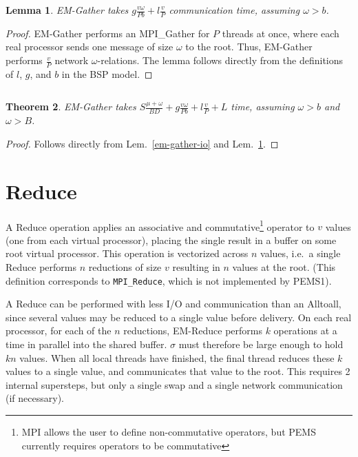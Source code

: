 \documentclass[12pt]{carletoncsthesis}
\newtheorem{thm}{Theorem}[section]
\newtheorem{lemma}[thm]{Lemma}
\begin{document}
$ $ \\

\begin{lemma}
\label{em-gather-comm}
{\sc EM-Gather} takes $g\frac{v\omega}{Pb} + l\frac{v}{P}$ communication
time, assuming $\omega > b$.
\end{lemma}
\begin{proof}
{\sc EM-Gather} performs an {\sc MPI\_Gather} for $P$ threads at once,
where each real processor sends one message of size $\omega$ to the root.
Thus, {\sc EM-Gather} performs $\frac{v}{P}$ network $\omega$-relations.
The lemma follows directly from the definitions of $l$, $g$, and $b$ in the
BSP model.
\end{proof}

$ $ \\

\begin{thm}
\label{em-gather-time}
{\sc EM-Gather} takes $S\frac{\mu + \omega}{BD} + g\frac{v\omega}{Pb} +
l\frac{v}{P} + L$ time, assuming $\omega > b$ and $\omega > B$.
\end{thm}
\begin{proof}
Follows directly from Lem.~\ref{em-gather-io} and Lem.~\ref{em-gather-comm}.
\end{proof}


\clearpage
\section{Reduce}


A Reduce operation applies an associative and commutative\footnote{MPI
allows the user to define non-commutative operators, but PEMS currently
requires operators to be commutative} operator to $v$ values (one from
each virtual processor), placing the single result in a buffer on some
root virtual processor.  This operation is vectorized across $n$ values,
i.e.\ a single Reduce performs $n$ reductions of size $v$ resulting in $n$
values at the root.  (This definition corresponds to {\tt MPI\_Reduce},
which is not implemented by PEMS1).

A Reduce can be performed with less I/O and communication than an Alltoall,
since several values may be reduced to a single value before delivery.
On each real processor, for each of the $n$ reductions, {\sc EM-Reduce}
performs $k$ operations at a time in parallel into the shared buffer.  $\sigma$
must therefore be large enough to hold $kn$ values.  When all local threads
have finished, the final thread reduces these $k$ values to a single value,
and communicates that value to the root.  This requires 2 internal supersteps,
but only a single swap and a single network communication (if necessary).
\end{document}
